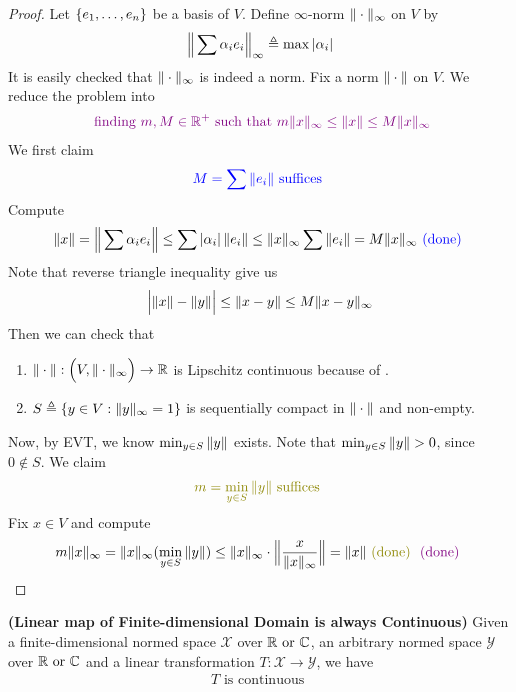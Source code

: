 \documentclass{report}
\begin{document}
\begin{proof}
Let $\left\{ e_1,\dots ,e_n \right\}$ be a basis of $V$. Define $\infty$-norm $\| \cdot \|_\infty$ on $V$ by 
\begin{align*}
\Big\| \sum \alpha_i e_i \Big\|_{\infty}\triangleq  \max \left|\alpha_i\right| 
\end{align*}
It is easily checked that $\| \cdot \|_\infty$ is indeed a norm. Fix a norm $\| \cdot \|$ on $V$. We reduce the problem into  
\begin{align*}
  \textcolor{violet}{\text{ finding $m,M\in\mathbb{R}^+$ such that }m\| x \|_\infty \leq \| x \|\leq M\| x \|_\infty}
\end{align*}
We first claim 
\begin{align*}
\textcolor{blue}{M=\sum \| e_i \|\text{ suffices }}
\end{align*}
Compute 
\begin{align*}
\| x \|= \Big\| \sum \alpha_ie_i \Big\| \leq \sum \left|\alpha _i\right| \| e_i \| \leq \| x \|_\infty \sum \| e_i \|= M \| x \|_\infty \textcolor{blue}{\text{ (done) }}
\end{align*}
Note that reverse triangle inequality give us 
\begin{align}
\label{Lip1}
\Big|\| x \|-\| y \|\Big|\leq \| x-y \| \leq M \| x-y \|_\infty
\end{align}
Then we can check that 
\begin{enumerate}[label=(\alph*)]
  \item  $\| \cdot \|:\Big(V,\| \cdot \|_\infty \Big)\rightarrow \mathbb{R}$ is Lipschitz continuous because of .
  \item $S\triangleq \left\{ y\in V:\| y \|_\infty=1 \right\}$ is sequentially compact in $\| \cdot \|$ and non-empty. 
\end{enumerate}
Now, by EVT, we know $\min _{y \in S}\| y \|$ exists. Note that $\min_{y \in S}\norm{y}>0$, since $0 \not\in S$. We claim 
\begin{align*}
  \olive{m= \min_{y \in S}\norm{y}\text{ suffices }}
\end{align*}
Fix $x \in V$ and compute 
\begin{align*}
m\norm{x}_\infty = \norm{x}_\infty (\min_{y \in S} \norm{y})\leq \norm{x}_\infty \cdot  \bnorm{ \frac{x}{\norm{x}_\infty}}=\norm{x}\odone \vdone
\end{align*}






\end{proof}
\begin{theorem}
\label{LmoF}
\textbf{(Linear map of Finite-dimensional Domain is always Continuous)} Given a finite-dimensional normed space $\mathcal{X}$ over $\mathbb{R}\text{ or }\mathbb{C}$, an arbitrary normed space  $\mathcal{Y}$ over $\mathbb{R}\text{ or }\mathbb{C}$ and a linear transformation  $T:\mathcal{X}\rightarrow \mathcal{Y}$, we have 
\begin{align*}
T\text{ is continuous }
\end{align*}
\end{theorem}
\end{document}
